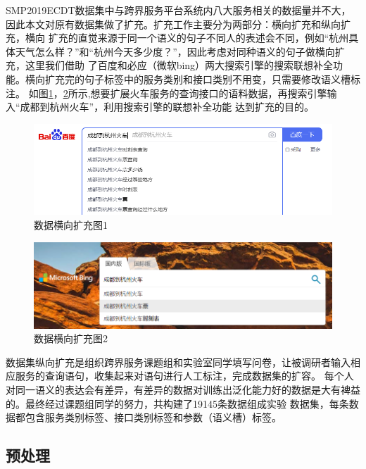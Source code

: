 SMP2019ECDT数据集中与跨界服务平台系统内八大服务相关的数据量并不大，因此本文对原有数据集做了扩充。扩充工作主要分为两部分：横向扩充和纵向扩充，横向
扩充的直觉来源于同一个语义的句子不同人的表述会不同，例如“杭州具体天气怎么样？”和“杭州今天多少度？”，因此考虑对同种语义的句子做横向扩充，这里我们借助
了百度和必应（微软bing）两大搜索引擎的搜索联想补全功能。横向扩充完的句子标签中的服务类别和接口类别不用变，只需要修改语义槽标注。
如图\ref{fig:baidu}，\ref{fig:bing}所示,想要扩展火车服务的查询接口的语料数据，再搜索引擎输入“成都到杭州火车”，利用搜索引擎的联想补全功能
达到扩充的目的。

\begin{figure}[htbp]
    \centering
    \includegraphics[width=15cm]{./images/baidu.png}
    \caption{数据横向扩充图1}
    \label{fig:baidu}
  \end{figure}

  \begin{figure}[htbp]
    \centering
    \includegraphics[width=15cm]{./images/bing.png}
    \caption{数据横向扩充图2}
    \label{fig:bing}
  \end{figure}

数据集纵向扩充是组织跨界服务课题组和实验室同学填写问卷，让被调研者输入相应服务的查询语句，收集起来对语句进行人工标注，完成数据集的扩容。
每个人对同一语义的表达会有差异，有差异的数据对训练出泛化能力好的数据是大有裨益的。最终经过课题组同学的努力，共构建了19145条数据组成实验
数据集，每条数据都包含服务类别标签、接口类别标签和参数（语义槽）标签。



\subsection{预处理}

